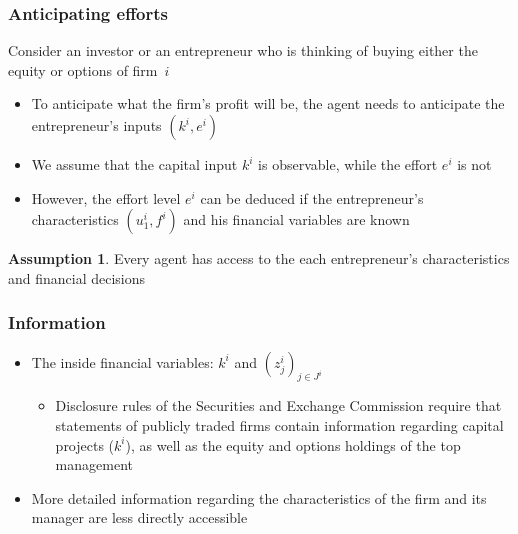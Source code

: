 \documentclass[blue]{beamer}
\theoremstyle{definition}
\newtheorem*{assumption}{Assumption}
\theoremstyle{example}
\begin{document}

\begin{frame}\frametitle{Anticipating efforts}

Consider an investor or an entrepreneur who is thinking of buying either the equity or options of firm~$i$
\begin{itemize}
\item To anticipate what the firm's profit will be, the agent needs to anticipate the entrepreneur's inputs $(k^i,e^i)$
\item We assume that the capital input $k^i$ is observable, while the effort $e^i$ is not
\item However, the effort level $e^i$ can be deduced if the entrepreneur's characteristics $(u^i_1,f^i)$ and his financial variables are known
\end{itemize}

\begin{assumption}
Every agent has access to the each entrepreneur's characteristics and financial decisions
\end{assumption}

\end{frame}


\begin{frame}\frametitle{Information}

\begin{itemize}
\item The inside financial variables: $k^i$ and $(z^i_j)_{j\in J^i}$
    \begin{itemize}
    \item Disclosure rules of the Securities and Exchange Commission require that statements of publicly traded firms contain information regarding capital projects ($k^i$), as well as the equity
and
options holdings of the top management
    \end{itemize}
\item More detailed information regarding the characteristics of the firm and its manager are less directly accessible
\end{itemize}

\end{frame}

\end{document}

